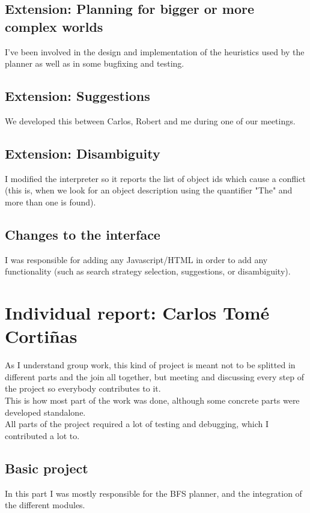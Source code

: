 \documentclass[11pt]{article}
\begin{document}
\subsection{Extension: Planning for bigger or more complex worlds}

I've been involved in the design and implementation of the heuristics used by the planner as well as in some 
bugfixing and testing.

\subsection{Extension: Suggestions}

We developed this between Carlos, Robert and me during one of our meetings.

\subsection{Extension: Disambiguity}

I modified the interpreter so it reports the list of object ids which cause a conflict (this is, 
when we look for an object description using the quantifier "The" and more than one is found).

\subsection{Changes to the interface}

I was responsible for adding any Javascript/HTML in order to add any functionality (such as search strategy selection, suggestions, or disambiguity). 

\section{Individual report: Carlos Tom\'e Cortiñas}
As I understand group work, this kind of project is meant not to be splitted 
in different parts and the join all together, but meeting and discussing every step
of the project so everybody contributes to it.  \\

This is how most part of the work was done, although some concrete parts were 
developed standalone.  \\

All parts of the project required a lot of testing and debugging, which I 
contributed a lot to.  \\

\subsection{Basic project}
In this part I was mostly responsible for the BFS planner, and the integration 
of the different modules. \\
\end{document}

